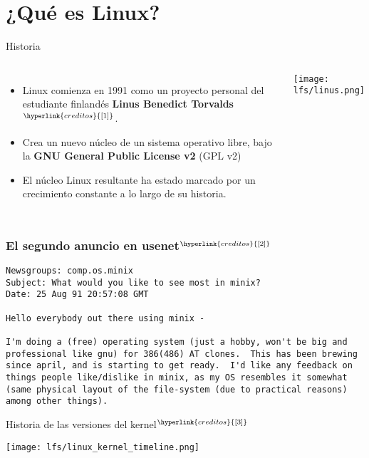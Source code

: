 
\section{¿Qué es Linux?}

\begin{frame}[c]{Historia}
  \begin{columns}
     \begin{itemize}
      \item Linux comienza en 1991 como un proyecto personal del estudiante
        finlandés \textbf{Linus Benedict Torvalds}$^{\hyperlink{creditos}{[1]}}$.
      \pausa
      \item Crea un nuevo núcleo de un sistema operativo libre, bajo la
        \textbf{GNU General Public License v2} (GPL v2)
      \pausa
      \item El núcleo Linux resultante ha estado marcado por un crecimiento
        constante a lo largo de su historia.
     \end{itemize}
      \pausa
      \begin{center}
        \texttt{[image: lfs/linus.png]}
      \end{center}
  \end{columns}
\end{frame}

\begin{frame}[fragile]
  \frametitle{El segundo anuncio en usenet$^{\hyperlink{creditos}{[2]}}$}
  \begin{block}{}
  \begin{verbatim}
Newsgroups: comp.os.minix
Subject: What would you like to see most in minix?
Date: 25 Aug 91 20:57:08 GMT

Hello everybody out there using minix -

I'm doing a (free) operating system (just a hobby, won't be big and
professional like gnu) for 386(486) AT clones.  This has been brewing
since april, and is starting to get ready.  I'd like any feedback on
things people like/dislike in minix, as my OS resembles it somewhat
(same physical layout of the file-system (due to practical reasons)
among other things).
  \end{verbatim}
  \end{block}
\end{frame}

\begin{frame}[c]{Historia de las versiones del kernel$^{\hyperlink{creditos}{[3]}}$}
  \begin{center}
    \texttt{[image: lfs/linux\_kernel\_timeline.png]}
  \end{center}
\end{frame}

